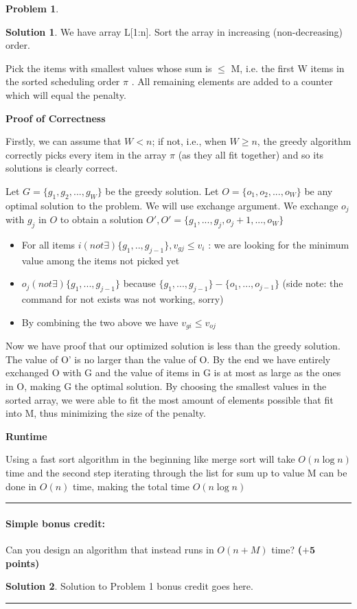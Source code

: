 \documentclass{article}
\theoremstyle{definition}
\newtheorem{problem}{Problem}
\def\fline{\rule{0.75\linewidth}{0.5pt}}
\newcommand{\finishline}{\begin{center}\fline\end{center}}
\newtheorem*{solution*}{Solution}
\newenvironment{solution}{\begin{solution*}}{{\finishline} \end{solution*}}
\newcommand{\grade}[1]{\hfill{\textbf{($\mathbf{#1}$ points)}}}
\begin{document}
\begin{problem}
\begin{solution}
	\item We have array L[1:n]. Sort the array in increasing (non-decreasing) order.
	\item Pick the items with smallest values whose sum is $\leq$ M, i.e. the first W items in the sorted scheduling order $\pi$ . All remaining elements are added to a counter which will equal the penalty.
	\item \textbf{Proof of Correctness}
	\item Firstly, we can assume that $W < n$; if not, i.e., when $W \geq n$, the greedy algorithm correctly picks every item in the array $\pi$ (as they all fit together) and so its solutions is clearly correct. 
	\item Let $G = \{g_1,g_2,...,g_W \}$ be the greedy solution. Let $O = \{o_1,o_2,...,o_W\}$ be any optimal solution to the problem. We will use exchange argument. We exchange $o_j$ with $g_j$ in $O$ to obtain a solution $O', O'= \{g_1 ,..., g_j, o_j+1 ,..., o_W\}$
	\begin{itemize}
		\item For all items $i (not\exists) \{g_1,..,g_{j-1}\}, v_{gj} \leq v_i$ : we are looking for the minimum value among the items not picked yet
		\item $o_ j  (not\exists) \{g_1,...,g_{j-1}\}$ because $\{g_1,...,g_{j-1}\} - \{o_1,...,o_{j-1}\}$  (side note: the command for not exists was not working, sorry)
		\item By combining the two above we have $v_{gi} \leq v_{oj}$
	\end{itemize}
	\item Now we have proof that our optimized solution is less than the greedy solution. The value of O' is no larger than the value of O. By the end we have entirely exchanged O with G and the value of items in G is at most as large as the ones in O, making G the optimal solution. By choosing the smallest values in the sorted array, we were able to fit the most amount of elements possible that fit into M, thus minimizing the size of the penalty.  
	\item \textbf{Runtime}
	\item Using a fast sort algorithm in the beginning like merge sort will take $O(n\log n)$ time and the second step iterating through the list for sum up to value M can be done in $O(n)$ time, making the total time $O(n\log n)$
\end{solution}	

	\paragraph{Simple bonus credit:} Can you design an algorithm that instead runs in $O(n+M)$ time? \grade{+5}
	
	
	\bigskip
	
\begin{solution}
	Solution to Problem 1 bonus credit goes here. 
\end{solution}	

\end{problem}
\end{document}
